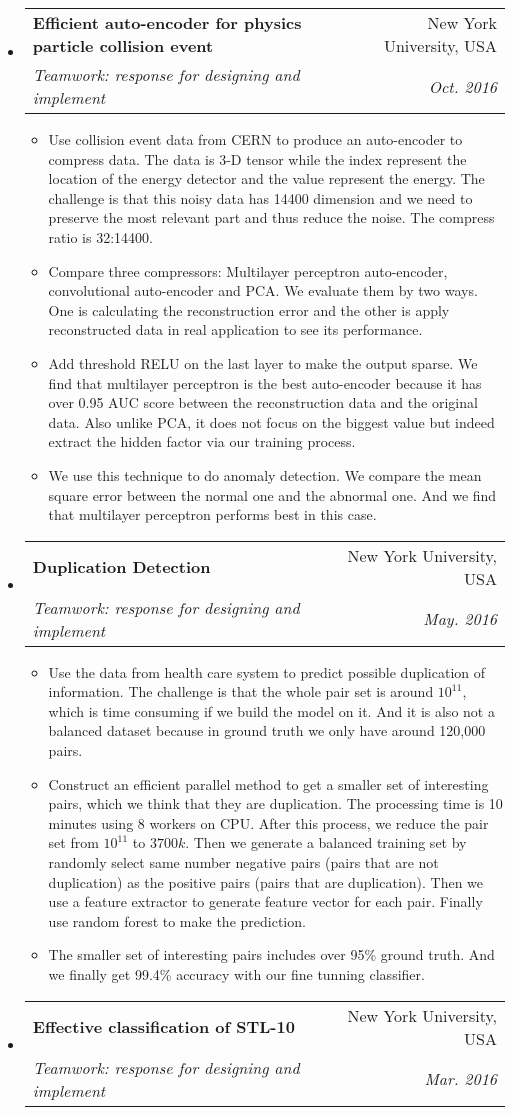\documentclass[a4paper,11pt]{article}
\makeatletter
\newcommand{\resitem}[1]{\item #1 \vspace{-2pt}}
\renewcommand{\normalsize}{\fontsize{12pt}{\baselineskip}\selectfont}
\newcommand{\ressubheading}[4]{
	\begin{tabular*}{6.5in}{l@{\extracolsep{\fill}}r}
		\textbf{#1} & #2 \\
		\textit{#3} & \textit{#4} \\
	\end{tabular*}\vspace{-6pt}}
\makeatother
\begin{document}
\begin{itemize}
				\item \ressubheading{{\normalsize Efficient auto-encoder for physics particle collision event}}{New York University, USA}{\normalsize Teamwork: response for designing and implement}{Oct. 2016}
				
				\begin{itemize}
					\resitem{Use collision event data from CERN to produce an auto-encoder to compress data. The data is 3-D tensor while the index represent the location of the energy detector and the value represent the energy. The challenge is that this noisy data has 14400 dimension and we need to preserve the most relevant part and thus reduce the noise. The compress ratio is 32:14400.}
					\resitem{Compare three compressors: Multilayer perceptron auto-encoder, convolutional auto-encoder and PCA. We evaluate them by two ways. One is calculating the reconstruction error and the other is apply reconstructed data in real application to see its performance.}
					\resitem{Add threshold RELU on the last layer to make the output sparse. We find that multilayer perceptron is the best auto-encoder because it has over 0.95 AUC score between the reconstruction data and the original data. Also unlike PCA, it does not focus on the biggest value but indeed extract the hidden factor via our training process.}
					\resitem{We use this technique to do anomaly detection. We compare the mean square error between the normal one and the abnormal one. And we find that multilayer perceptron performs best in this case.}
				\end{itemize}
			\item \ressubheading{\normalsize Duplication Detection}{New York University, USA}{\normalsize Teamwork: response for designing and implement}{May. 2016}
			
			\begin{itemize}
				\resitem{Use the data from health care system to predict possible duplication of information. The challenge is that the whole pair set is around $ 10^{11} $, which is time consuming if we build the model on it. And it is also not a balanced dataset because in ground truth we only have around 120,000 pairs.}
				\resitem{Construct an efficient parallel method to get a smaller set of interesting pairs, which we think that they are duplication. The processing time is 10 minutes using 8 workers on CPU. After this process, we reduce the pair set from $ 10^{11} $ to $ 3700k $. Then we generate a balanced training set by randomly select same number negative pairs (pairs that are not duplication) as the positive pairs (pairs that are duplication). Then we use a feature extractor to generate feature vector for each pair. Finally use random forest to make the prediction.}
				\resitem{The smaller set of interesting pairs includes over 95\% ground truth. And we finally get 99.4\% accuracy with our fine tunning classifier.} 
			\end{itemize}
				\newpage
			\item \ressubheading{{\normalsize Effective classification of STL-10}}{New York University, USA}{\normalsize Teamwork: response for designing and implement}{Mar. 2016}
			

\end{itemize}
\end{document}
